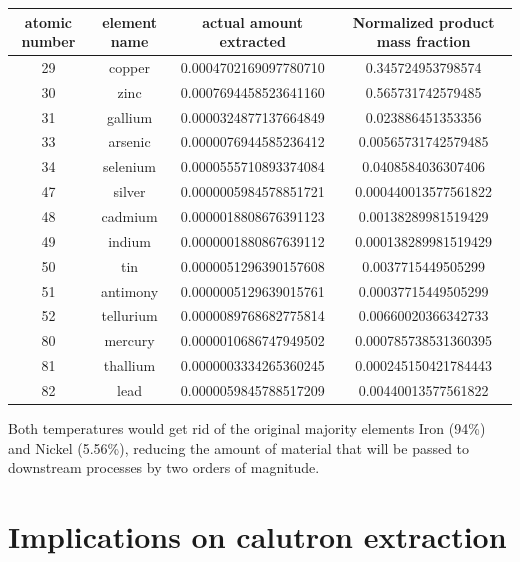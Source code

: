 \documentclass[a4paper]{article}
\begin{document}
    \begin{center}
    	\begin{tabular}{|c|c|c|c|}
    		\hline
    		atomic number & element name & actual amount extracted & Normalized product mass fraction \\
    		\hline
    		29 & copper & 0.0004702169097780710 & 0.345724953798574 \\
    		\hline
    		30 & zinc & 0.0007694458523641160 & 0.565731742579485 \\
    		\hline
    		31 & gallium & 0.0000324877137664849 & 0.023886451353356 \\
    		\hline
    		33 & arsenic & 0.0000076944585236412 & 0.00565731742579485 \\
    		\hline
    		34 & selenium & 0.0000555710893374084 & 0.0408584036307406 \\
    		\hline
    		47 & silver & 0.0000005984578851721 & 0.000440013577561822 \\
    		\hline
    		48 & cadmium & 0.0000018808676391123 & 0.00138289981519429 \\
    		\hline
    		49 & indium & 0.0000001880867639112 & 0.000138289981519429 \\
    		\hline
    		50 & tin & 0.0000051296390157608 & 0.0037715449505299 \\
    		\hline
    		51 & antimony & 0.0000005129639015761 & 0.00037715449505299 \\
    		\hline
    		52 & tellurium & 0.0000089768682775814 & 0.00660020366342733 \\
    		\hline
    		80 & mercury & 0.0000010686747949502 & 0.000785738531360395 \\
    		\hline
    		81 & thallium & 0.0000003334265360245 & 0.000245150421784443 \\
    		\hline
    		82 & lead & 0.0000059845788517209 & 0.00440013577561822 \\
    		\hline
    	\end{tabular}
    \end{center}
	
	Both temperatures would get rid of the original majority elements Iron (94\%) and Nickel (5.56\%), reducing the amount of material that will be passed to downstream processes by two orders of magnitude.
	
	\pagebreak
	
	\section{Implications on calutron extraction}
	
\end{document}
